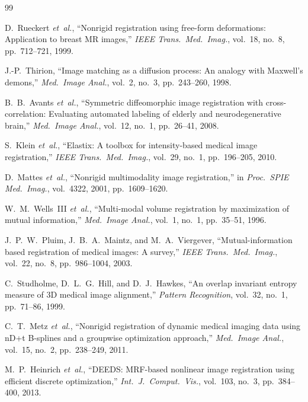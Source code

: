 \documentclass[10pt,twocolumn]{article}
\begin{document}
\begin{thebibliography}{99}

D.~Rueckert \emph{et~al.},
``Nonrigid registration using free-form deformations: Application to
breast MR images,''
\emph{IEEE Trans.\ Med.\ Imag.}, vol.~18, no.~8, pp.~712--721, 1999.

J.-P.~Thirion,
``Image matching as a diffusion process: An analogy with Maxwell's
demons,''
\emph{Med.\ Image Anal.}, vol.~2, no.~3, pp.~243--260, 1998.

B.~B.~Avants \emph{et~al.},
``Symmetric diffeomorphic image registration with cross-correlation:
Evaluating automated labeling of elderly and neurodegenerative brain,''
\emph{Med.\ Image Anal.}, vol.~12, no.~1, pp.~26--41, 2008.

S.~Klein \emph{et~al.},
``Elastix: A toolbox for intensity-based medical image registration,''
\emph{IEEE Trans.\ Med.\ Imag.}, vol.~29, no.~1, pp.~196--205, 2010.

D.~Mattes \emph{et~al.},
``Nonrigid multimodality image registration,''
in \emph{Proc.\ SPIE Med.\ Imag.}, vol.~4322, 2001, pp.~1609--1620.

W.~M.~Wells~III \emph{et~al.},
``Multi-modal volume registration by maximization of mutual information,''
\emph{Med.\ Image Anal.}, vol.~1, no.~1, pp.~35--51, 1996.

J.~P.~W.~Pluim, J.~B.~A.~Maintz, and M.~A.~Viergever,
``Mutual-information based registration of medical images: A survey,''
\emph{IEEE Trans.\ Med.\ Imag.}, vol.~22, no.~8, pp.~986--1004, 2003.

C.~Studholme, D.~L.~G.~Hill, and D.~J.~Hawkes,
``An overlap invariant entropy measure of 3D medical image alignment,''
\emph{Pattern Recognition}, vol.~32, no.~1, pp.~71--86, 1999.

C.~T.~Metz \emph{et~al.},
``Nonrigid registration of dynamic medical imaging data using nD+t
B-splines and a groupwise optimization approach,''
\emph{Med.\ Image Anal.}, vol.~15, no.~2, pp.~238--249, 2011.

M.~P.~Heinrich \emph{et~al.},
``DEEDS: MRF-based nonlinear image registration using efficient discrete
optimization,''
\emph{Int.\ J.\ Comput.\ Vis.}, vol.~103, no.~3, pp.~384--400, 2013.


\end{thebibliography}
\end{document}
